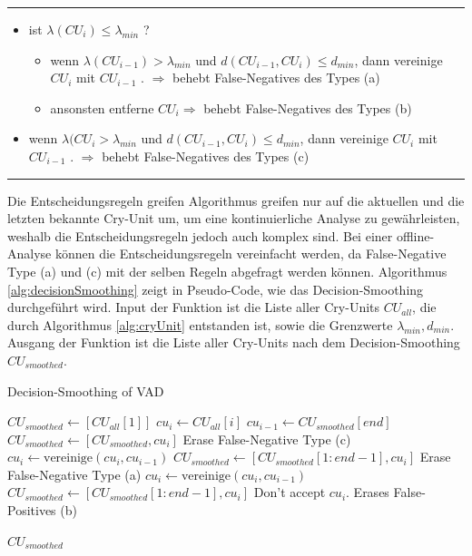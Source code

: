 \noindent\rule{\linewidth}{0.3pt}
\begin{itemize}
	\item ist $\lambda (CU_{i}) \leq \lambda_{min}$ ?
	\begin{itemize}
		\item wenn $\lambda (CU_{i-1}) > \lambda_{min}$ und $d (CU_{i-1}, CU_{i}) \leq d_{min}$, dann vereinige $CU_{i}$ mit $CU_{i-1}$ . $\Rightarrow$ behebt False-Negatives des Types (a)
		\item ansonsten entferne $CU_i \Rightarrow$ behebt False-Negatives des Types (b)
	\end{itemize}
	\item wenn $\lambda (CU_{i} > \lambda_{min}$ und $d (CU_{i-1}, CU_{i}) \leq d_{min}$, dann vereinige $CU_{i}$ mit $CU_{i-1}$ . $\Rightarrow$ behebt False-Negatives des Types (c)
\end{itemize}
\noindent\rule{\linewidth}{0.3pt}

Die Entscheidungsregeln greifen Algorithmus greifen nur auf die aktuellen und die letzten bekannte Cry-Unit um, um eine kontinuierliche Analyse zu gewährleisten, weshalb die Entscheidungsregeln jedoch auch komplex sind. Bei einer offline-Analyse können die Entscheidungsregeln vereinfacht werden, da False-Negative Type (a) und (c) mit der selben Regeln abgefragt werden können. Algorithmus \ref{alg:decisionSmoothing} zeigt in Pseudo-Code, wie das Decision-Smoothing durchgeführt wird. Input der Funktion ist die Liste aller Cry-Units $CU_{all}$, die durch Algorithmus \ref{alg:cryUnit} entstanden ist, sowie die Grenzwerte $\lambda_{min}, d_{min}$. Ausgang der Funktion ist die Liste aller Cry-Units nach dem Decision-Smoothing $CU_{smoothed}$.

\begin{algorithm}[H]
	\caption{Decision-Smoothing of VAD}
	\label{alg:decisionSmoothing}
	\begin{algorithmic}[1]
		\State $CU_{smoothed} \gets[CU_{all}[1]] $
		\State $cu_i \gets CU_{all}[i]$
		\State $cu_{i-1} \gets CU_{smoothed}[end]$
		\State $CU_{smoothed} \gets [CU_{smoothed}, cu_i] $
		\Else
		\State \Comment Erase False-Negative Type (c)
		\State $cu_i \gets \text{vereinige}(cu_i, cu_{i-1})$
		\State $CU_{smoothed} \gets [CU_{smoothed}[1:end-1], cu_i] $
		\EndIf
		\Else
		\State \Comment Erase False-Negative Type (a)
		\State $cu_i \gets \text{vereinige}(cu_i, cu_{i-1})$
		\State $CU_{smoothed} \gets [CU_{smoothed}[1:end-1], cu_i] $
		\Else
		\State \Comment Don't accept $cu_i$. Erases False-Positives (b)
		\EndIf
		\EndIf
		\EndFor
		
		\Return $CU_{smoothed}$
		\EndFunction
		
	\end{algorithmic}
\end{algorithm}

